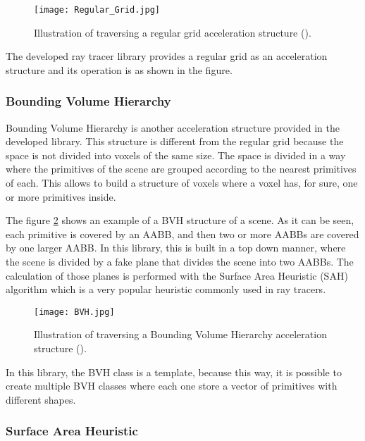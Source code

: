 \begin{figure}[H]
	\centering
	\caption{Illustration of traversing a regular grid acceleration structure (\cite{RegularGrid}).}
	\label{RegularGrid.}
	\texttt{[image: Regular\_Grid.jpg]}
\end{figure}

\par
The developed ray tracer library provides a regular grid as an acceleration structure and its operation is as shown in the figure.

\subsubsection{Bounding Volume Hierarchy}

\par
Bounding Volume Hierarchy is another acceleration structure provided in the developed library.
This structure is different from the regular grid because the space is not divided into voxels of the same size.
The space is divided in a way where the primitives of the scene are grouped according to the nearest primitives of each.
This allows to build a structure of voxels where a voxel has, for sure, one or more primitives inside.

\par
The figure \ref{BVH.} shows an example of a BVH structure of a scene.
As it can be seen, each primitive is covered by an AABB, and then two or more AABBs are covered by one larger AABB.
In this library, this is built in a top down manner, where the scene is divided by a fake plane that divides the scene into two AABBs.
The calculation of those planes is performed with the Surface Area Heuristic (SAH) algorithm which is a very popular heuristic commonly used in ray tracers.

\begin{figure}[H]
	\centering
	\caption{Illustration of traversing a Bounding Volume Hierarchy acceleration structure (\cite{BVH}).}
	\label{BVH.}
	\texttt{[image: BVH.jpg]}
\end{figure}

\par
In this library, the BVH class is a template, because this way, it is possible to create multiple BVH classes where each one store a vector of primitives with different shapes.

\subsubsection{Surface Area Heuristic}

